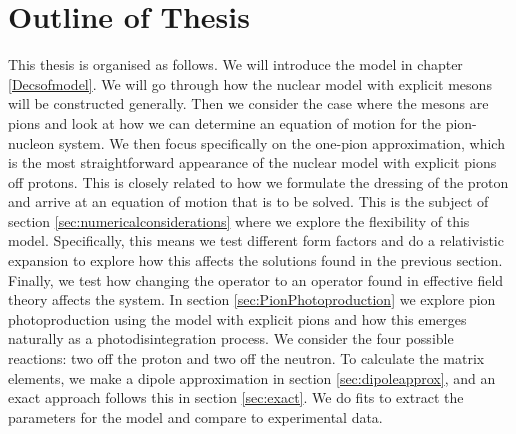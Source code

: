 \section{Outline of Thesis}
This thesis is organised as follows. We will introduce the model in chapter \ref{Decsofmodel}. We will go through how the nuclear model with explicit mesons will be constructed generally. Then we consider the case where the mesons are pions and look at how we can determine an equation of motion for the pion-nucleon system. We then focus specifically on the one-pion approximation, which is the most straightforward appearance of the nuclear model with explicit pions off protons. This is closely related to how we formulate the dressing of the proton and arrive at an equation of motion that is to be solved. This is the subject of section \ref{sec:numericalconsiderations} where we explore the flexibility of this model. Specifically, this means we test different form factors and do a relativistic expansion to explore how this affects the solutions found in the previous section. Finally, we test how changing the operator to an operator found in effective field theory affects the system. In section \ref{sec:PionPhotoproduction} we explore pion photoproduction using the model with explicit pions and how this emerges naturally as a photodisintegration process. We consider the four possible reactions: two off the proton and two off the neutron. To calculate the matrix elements, we make a dipole approximation in section \ref{sec:dipoleapprox}, and an exact approach follows this in section \ref{sec:exact}. We do fits to extract the parameters for the model and compare to experimental data.

